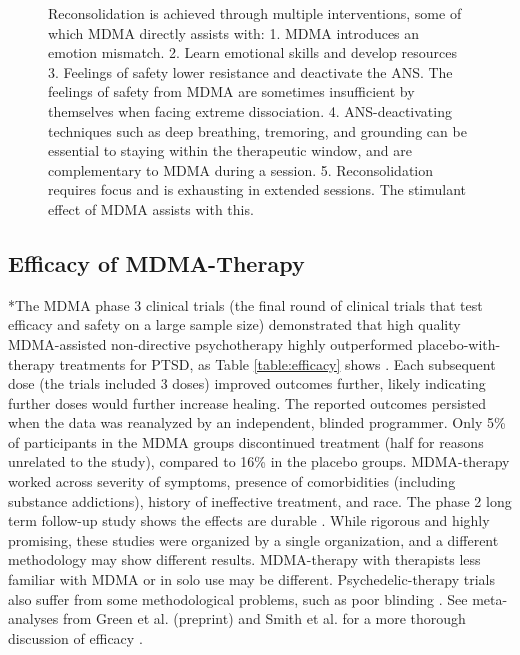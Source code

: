 \documentclass[12pt,letterpaper]{article}
\begin{document}
\begin{figure}[h!]
\begin{framed}
\end{framed}
\caption{Reconsolidation is achieved through multiple interventions, some of which MDMA directly assists with: 1. MDMA introduces an emotion mismatch. 2. Learn emotional skills and develop resources 3. Feelings of safety lower resistance and deactivate the ANS. The feelings of safety from MDMA are sometimes insufficient by themselves when facing extreme dissociation. 4. ANS-deactivating techniques such as deep breathing, tremoring, and grounding can be essential to staying within the therapeutic window, and are complementary to MDMA during a session. 5. Reconsolidation requires focus and is exhausting in extended sessions. The stimulant effect of MDMA assists with this.}
\label{fig:healing}
\end{figure}
\FloatBarrier
\subsection{Efficacy of MDMA-Therapy}
*The MDMA phase 3 clinical trials (the final round of clinical trials that test efficacy and safety on a large sample size) demonstrated that high quality MDMA-assisted non-directive psychotherapy highly outperformed placebo-with-therapy treatments for PTSD, as Table \ref{table:efficacy} shows \cite{mitchellMDMAClinicalTrial,mitchellMDMAClinicalTrial2}. Each subsequent dose (the trials included 3 doses) improved outcomes further, likely indicating further doses would further increase healing. The reported outcomes persisted when the data was reanalyzed by an independent, blinded programmer. Only 5\% of participants in the MDMA groups discontinued treatment (half for reasons unrelated to the study), compared to 16\% in the placebo groups. MDMA-therapy worked across severity of symptoms, presence of comorbidities (including substance addictions), history of ineffective treatment, and race. The phase 2 long term follow-up study shows the effects are durable \cite{jeromeMDMALongTerm}. While rigorous and highly promising, these studies were organized by a single organization, and a different methodology may show different results. MDMA-therapy with therapists less familiar with MDMA or in solo use may be different. Psychedelic-therapy trials also suffer from some methodological problems, such as poor blinding \cite{adayMethodologicalRigor}. See meta-analyses from Green et al. (preprint) and Smith et al. for a more thorough discussion of efficacy \cite{greenMeta,smithSystematic}.
\end{document}

